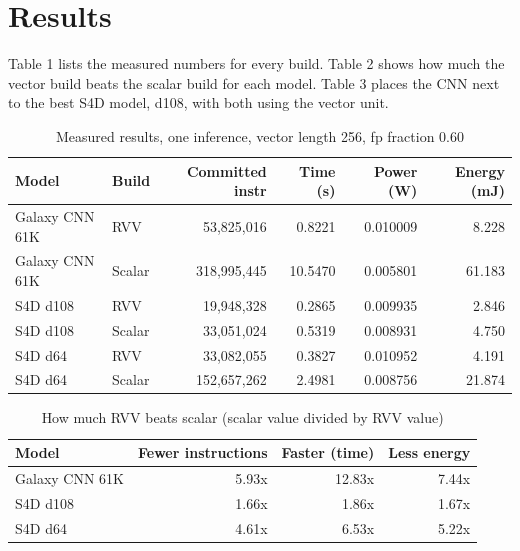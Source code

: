 \documentclass[11pt]{article}
\begin{document}
\section{Results}

Table 1 lists the measured numbers for every build. Table 2 shows how much the vector build beats the scalar build for each model. Table 3 places the CNN next to the best S4D model, d108, with both using the vector unit.

\begin{table}[h]
\centering
\caption{Measured results, one inference, vector length 256, fp fraction 0.60}
\begin{tabular}{llrrrr}
\toprule
Model & Build & Committed instr & Time (s) & Power (W) & Energy (mJ) \\
\midrule
Galaxy CNN 61K & RVV    & 53{,}825{,}016  & 0.8221 & 0.010009 & 8.228 \\
Galaxy CNN 61K & Scalar & 318{,}995{,}445 & 10.5470 & 0.005801 & 61.183 \\
S4D d108       & RVV    & 19{,}948{,}328  & 0.2865 & 0.009935 & 2.846 \\
S4D d108       & Scalar & 33{,}051{,}024  & 0.5319 & 0.008931 & 4.750 \\
S4D d64        & RVV    & 33{,}082{,}055  & 0.3827 & 0.010952 & 4.191 \\
S4D d64        & Scalar & 152{,}657{,}262 & 2.4981 & 0.008756 & 21.874 \\
\bottomrule
\end{tabular}
\end{table}

\begin{table}[h]
\centering
\caption{How much RVV beats scalar (scalar value divided by RVV value)}
\begin{tabular}{lrrr}
\toprule
Model & Fewer instructions & Faster (time) & Less energy \\
\midrule
Galaxy CNN 61K & 5.93x & 12.83x & 7.44x \\
S4D d108       & 1.66x & 1.86x  & 1.67x \\
S4D d64        & 4.61x & 6.53x  & 5.22x \\
\bottomrule
\end{tabular}
\end{table}
\end{document}
